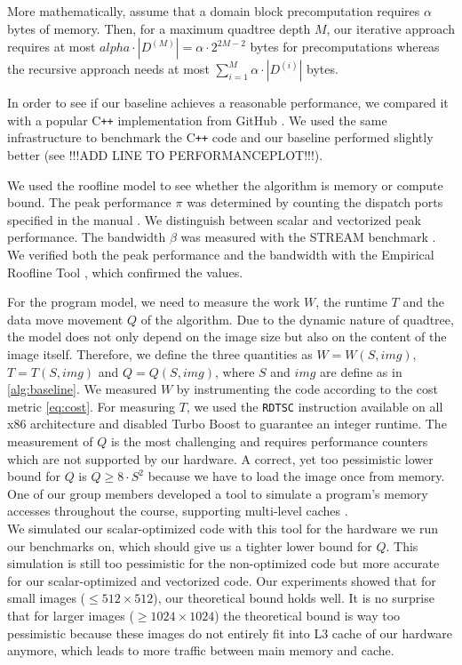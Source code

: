 More mathematically, assume that a domain block precomputation requires $\alpha$ bytes of memory.
Then, for a maximum quadtree depth $M$, our iterative approach requires at most 
$alpha \cdot |D^{(M)}| = \alpha \cdot 2^{2M-2}$ bytes for precomputations 
whereas the recursive approach needs at most $\sum_{i=1}^M \alpha \cdot |D^{(i)}|$ bytes.


In order to see if our baseline achieves a reasonable performance, we compared it with
a popular C\texttt{++} implementation from GitHub \cite{github-cpp}. We used the same infrastructure to benchmark
the C\texttt{++} code and our baseline performed slightly better (see !!!ADD LINE TO PERFORMANCEPLOT!!!).

 We used the roofline model \cite{applying-roofline} to see whether the algorithm is memory or
compute bound. The peak performance $\pi$ was determined by counting the dispatch
ports specified in the manual \cite{intel-opt-manual}. We distinguish between scalar and vectorized peak
performance. The bandwidth $\beta$ was measured with the STREAM benchmark \cite{stream}. We verified both the peak
performance and the bandwidth with the Empirical Roofline Tool \cite{ert}, which confirmed the values.

For the program model, we need to measure the work $W$, the runtime $T$ and the data move movement $Q$ of
the algorithm. Due to the dynamic nature of quadtree, the model does not only depend on the image size 
but also on the content of the image itself. Therefore, we define the three 
quantities as $W=W(S, img)$, $T=T(S, img)$ and $Q=Q(S, img)$, where $S$ and $img$ are define as in 
\ref{alg:baseline}. We measured $W$ by instrumenting the code according to the cost metric \ref{eq:cost}.
For measuring $T$, we used the \texttt{RDTSC} instruction available on all x86 architecture and disabled
Turbo Boost to guarantee an integer runtime. The measurement of $Q$ is the most challenging and requires
performance counters which are not supported by our hardware. A correct, yet too pessimistic lower bound for $Q$
is $Q \geq 8 \cdot S^2$ because we have to load the image once from memory. One of our group members
developed a tool to simulate a program's memory accesses throughout the course, supporting multi-level caches \cite{github-cache}.\\
We simulated our scalar-optimized code with this tool for the hardware we run our benchmarks on, 
which should give us a tighter lower bound for $Q$. 
This simulation is still too pessimistic for the non-optimized code but more accurate for our scalar-optimized and vectorized code. 
Our experiments showed that for small images ($\leq 512 \times 512$), our theoretical bound holds well. 
It is no surprise that for larger images ($\geq 1024 \times 1024$) the theoretical bound is way too pessimistic
because these images do not entirely fit into L3 cache of our hardware anymore, which leads to more traffic between main memory and cache.

